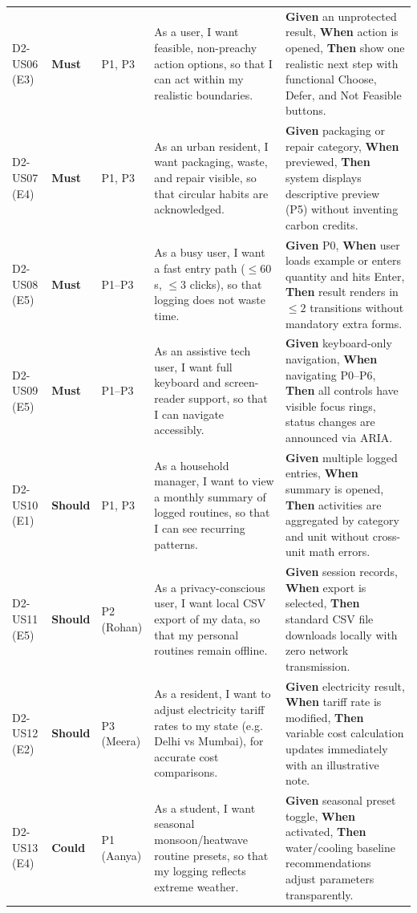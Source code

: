 \documentclass[12pt,a4paper]{article}
\begin{document}
\begin{table}[ht]
\begin{tabularx}{\textwidth}{@{}p{1.2cm}p{1.3cm}p{1.5cm}Xp{4.8cm}@{}}
D2-US06 (E3) & \textbf{Must} & P1, P3 & As a user, I want feasible, non-preachy action options, so that I can act within my realistic boundaries. & \textbf{Given} an unprotected result, \textbf{When} action is opened, \textbf{Then} show one realistic next step with functional Choose, Defer, and Not Feasible buttons.\\
D2-US07 (E4) & \textbf{Must} & P1, P3 & As an urban resident, I want packaging, waste, and repair visible, so that circular habits are acknowledged. & \textbf{Given} packaging or repair category, \textbf{When} previewed, \textbf{Then} system displays descriptive preview (P5) without inventing carbon credits.\\
D2-US08 (E5) & \textbf{Must} & P1--P3 & As a busy user, I want a fast entry path ($\le 60$s, $\le 3$ clicks), so that logging does not waste time. & \textbf{Given} P0, \textbf{When} user loads example or enters quantity and hits Enter, \textbf{Then} result renders in $\le 2$ transitions without mandatory extra forms.\\
D2-US09 (E5) & \textbf{Must} & P1--P3 & As an assistive tech user, I want full keyboard and screen-reader support, so that I can navigate accessibly. & \textbf{Given} keyboard-only navigation, \textbf{When} navigating P0--P6, \textbf{Then} all controls have visible focus rings, status changes are announced via ARIA.\\
\midrule
D2-US10 (E1) & \textbf{Should} & P1, P3 & As a household manager, I want to view a monthly summary of logged routines, so that I can see recurring patterns. & \textbf{Given} multiple logged entries, \textbf{When} summary is opened, \textbf{Then} activities are aggregated by category and unit without cross-unit math errors.\\
D2-US11 (E5) & \textbf{Should} & P2 (Rohan) & As a privacy-conscious user, I want local CSV export of my data, so that my personal routines remain offline. & \textbf{Given} session records, \textbf{When} export is selected, \textbf{Then} standard CSV file downloads locally with zero network transmission.\\
D2-US12 (E2) & \textbf{Should} & P3 (Meera) & As a resident, I want to adjust electricity tariff rates to my state (e.g. Delhi vs Mumbai), for accurate cost comparisons. & \textbf{Given} electricity result, \textbf{When} tariff rate is modified, \textbf{Then} variable cost calculation updates immediately with an illustrative note.\\
\midrule
D2-US13 (E4) & \textbf{Could} & P1 (Aanya) & As a student, I want seasonal monsoon/heatwave routine presets, so that my logging reflects extreme weather. & \textbf{Given} seasonal preset toggle, \textbf{When} activated, \textbf{Then} water/cooling baseline recommendations adjust parameters transparently.\\

\end{tabularx}
\end{table}
\end{document}
